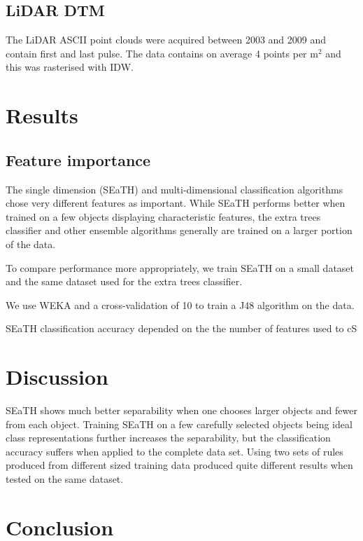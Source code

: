\documentclass[a4paper,12pt]{article}
\begin{document}
\subsection{LiDAR DTM}
The LiDAR ASCII point clouds were acquired between 2003 and 2009 and contain
first and last pulse. The data contains on average 4 points per m$^{2}$ and
this was rasterised with IDW.

\section{Results}
\subsection{Feature importance}
The single dimension (SEaTH) and multi-dimensional classification
algorithms chose very different features as important. While SEaTH performs
better when trained on a few objects displaying characteristic
features\cite{Nussbaum2006}, the extra trees classifier and other ensemble
algorithms generally are trained on a larger portion of the data. 

To compare performance more appropriately, we train SEaTH on a small dataset and
the same dataset used for the extra trees classifier.

We use WEKA and a cross-validation of 10 to train a J48 algorithm on the data.

SEaTH classification accuracy depended on the the number of features used to cS

\section{Discussion}
SEaTH shows much better separability when one chooses larger objects and fewer
from each object. Training SEaTH on a few carefully selected objects being ideal
class representations further increases the separability, but the classification
accuracy suffers when applied to the complete data set. Using two sets of rules
produced from different sized training data produced quite different results
when tested on the same dataset.
\section{Conclusion}
\end{document}
